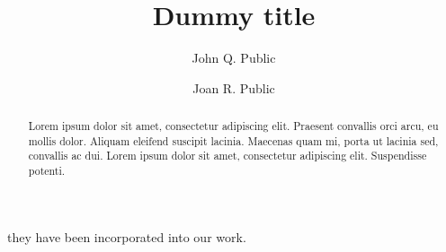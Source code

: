 \documentclass[a4paper,USenglish,english]{lipics-v2018}
\title{Dummy title}
\author{John Q. Public}{Dummy University Computing Laboratory, [Address], Country}{johnqpublic@dummyuni.org}{https://orcid.org/0000-0002-1825-0097}{[funding]}%
\author{Joan R. Public}{Department of Informatics, Dummy College, [Address], Country}{joanrpublic@dummycollege.org}{[orcid]}{[funding]}
\begin{document}
\maketitle










%
%
% 


\clearpage

they have been incorporated into our work.
\begin{abstract}
Lorem ipsum dolor sit amet, consectetur adipiscing elit. Praesent convallis orci arcu, eu mollis dolor. Aliquam eleifend suscipit lacinia. Maecenas quam mi, porta ut lacinia sed, convallis ac dui. Lorem ipsum dolor sit amet, consectetur adipiscing elit. Suspendisse potenti. 
 \end{abstract}
\end{document}
